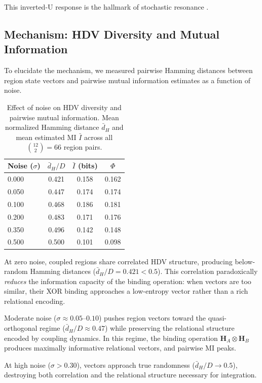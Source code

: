 \documentclass[12pt,a4paper]{article}
\begin{document}
This inverted-U response is the hallmark of stochastic resonance \citep{gammaitoni1998stochastic}.

\subsection{Mechanism: HDV Diversity and Mutual Information}

To elucidate the mechanism, we measured pairwise Hamming distances between region state vectors and pairwise mutual information estimates as a function of noise.

\begin{table}[H]
\centering
\caption{Effect of noise on HDV diversity and pairwise mutual information. Mean normalized Hamming distance $\bar{d}_H$ and mean estimated MI $\bar{I}$ across all $\binom{12}{2} = 66$ region pairs.}
\label{tab:diversity}
\begin{tabular}{lccc}
\toprule
\textbf{Noise ($\sigma$)} & \textbf{$\bar{d}_H / D$} & \textbf{$\bar{I}$ (bits)} & \textbf{$\Phi$} \\
\midrule
0.000 & 0.421 & 0.158 & 0.162 \\
0.050 & 0.447 & 0.174 & 0.174 \\
0.100 & 0.468 & 0.186 & 0.181 \\
0.200 & 0.483 & 0.171 & 0.176 \\
0.350 & 0.496 & 0.142 & 0.148 \\
0.500 & 0.500 & 0.101 & 0.098 \\
\bottomrule
\end{tabular}
\end{table}

At zero noise, coupled regions share correlated HDV structure, producing below-random Hamming distances ($\bar{d}_H/D = 0.421 < 0.5$). This correlation paradoxically \emph{reduces} the information capacity of the binding operation: when vectors are too similar, their XOR binding approaches a low-entropy vector rather than a rich relational encoding.

Moderate noise ($\sigma \approx 0.05$--$0.10$) pushes region vectors toward the quasi-orthogonal regime ($\bar{d}_H/D \approx 0.47$) while preserving the relational structure encoded by coupling dynamics. In this regime, the binding operation $\mathbf{H}_A \otimes \mathbf{H}_B$ produces maximally informative relational vectors, and pairwise MI peaks.

At high noise ($\sigma > 0.30$), vectors approach true randomness ($\bar{d}_H/D \to 0.5$), destroying both correlation and the relational structure necessary for integration.
\end{document}

